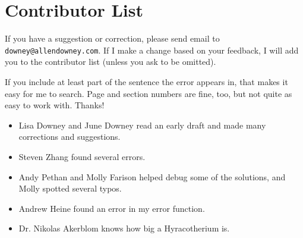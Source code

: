 \documentclass[12pt]{book}
\begin{document}



\section*{Contributor List}


If you have a suggestion or correction, please send email to 
{\tt downey@allendowney.com}.  If I make a change based on your
feedback, I will add you to the contributor list
(unless you ask to be omitted).

If you include at least part of the sentence the
error appears in, that makes it easy for me to search.  Page and
section numbers are fine, too, but not quite as easy to work with.
Thanks!

\small

\begin{itemize}

\item Lisa Downey and June Downey read an early draft and made many
corrections and suggestions.

\item Steven Zhang found several errors.

\item Andy Pethan and Molly Farison helped debug some of the solutions,
and Molly spotted several typos.

\item Andrew Heine found an error in my error function.

\item Dr. Nikolas Akerblom knows how big a Hyracotherium is.


\end{itemize}

\normalsize

\clearemptydoublepage

\begin{latexonly}

\tableofcontents

\clearemptydoublepage

\end{latexonly}

\mainmatter
\end{document}
